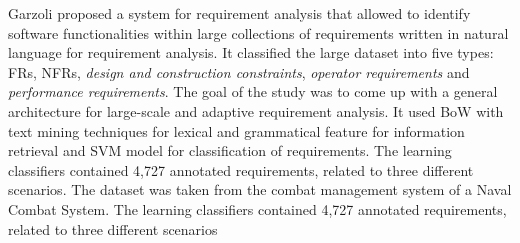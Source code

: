 Garzoli \cite {Garzoli:2013} proposed a system for requirement analysis that allowed to identify software functionalities within large collections of requirements written in natural language for requirement analysis. It classified the large dataset into five types:
FRs, NFRs, \emph{design and construction constraints}, \emph{operator
requirements} and \emph{performance requirements}.  The goal of the study was to come up with a general
architecture for large-scale and adaptive requirement analysis. It used BoW with text mining techniques for lexical and grammatical feature for information retrieval and SVM model for classification of requirements. The learning classifiers contained 4,727 annotated requirements, related
to three different scenarios. The dataset was taken from
the combat management system of a Naval Combat System. The learning classifiers contained 4,727 annotated requirements, related
to three different scenarios\\

